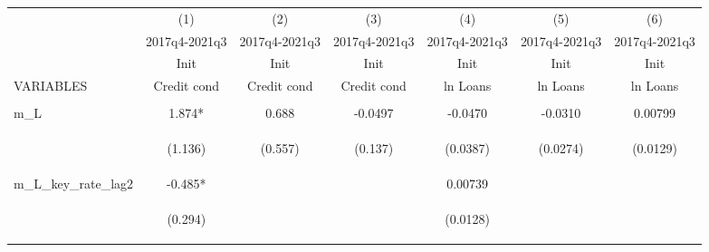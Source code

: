 \documentclass[]{article}
\begin{document}
\begin{center}
\begin{tabular}{lcccccc} \hline
 & (1) & (2) & (3) & (4) & (5) & (6) \\
 & 2017q4-2021q3 & 2017q4-2021q3 & 2017q4-2021q3 & 2017q4-2021q3 & 2017q4-2021q3 & 2017q4-2021q3 \\
 & Init & Init & Init & Init & Init & Init \\
VARIABLES & Credit cond & Credit cond & Credit cond & ln Loans & ln Loans & ln Loans \\ \hline
\vspace{4pt} & \begin{footnotesize}\end{footnotesize} & \begin{footnotesize}\end{footnotesize} & \begin{footnotesize}\end{footnotesize} & \begin{footnotesize}\end{footnotesize} & \begin{footnotesize}\end{footnotesize} & \begin{footnotesize}\end{footnotesize} \\
m\_L & 1.874* & 0.688 & -0.0497 & -0.0470 & -0.0310 & 0.00799 \\
\vspace{4pt} & \begin{footnotesize}(1.136)\end{footnotesize} & \begin{footnotesize}(0.557)\end{footnotesize} & \begin{footnotesize}(0.137)\end{footnotesize} & \begin{footnotesize}(0.0387)\end{footnotesize} & \begin{footnotesize}(0.0274)\end{footnotesize} & \begin{footnotesize}(0.0129)\end{footnotesize} \\
m\_L\_key\_rate\_lag2 & -0.485* &  &  & 0.00739 &  &  \\
\vspace{4pt} & \begin{footnotesize}(0.294)\end{footnotesize} & \begin{footnotesize}\end{footnotesize} & \begin{footnotesize}\end{footnotesize} & \begin{footnotesize}(0.0128)\end{footnotesize} & \begin{footnotesize}\end{footnotesize} & \begin{footnotesize}\end{footnotesize} \\

\end{tabular}
\end{center}
\end{document}
